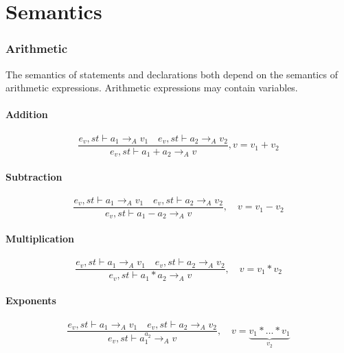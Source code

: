 \chapter{Semantics}\label{app:semantics}
\subsection*{Arithmetic}
The semantics of statements and declarations both depend on the semantics of arithmetic expressions.
Arithmetic expressions may contain variables.
\subsubsection{Addition}
\begin{equation}
	\frac { { e }_{ v },st\vdash { a }_{ 1 }{ \rightarrow  }_{ A }{ v }_{ 1 }\quad { e }_{ v },st\vdash { a }_{ 2 }{ \rightarrow  }_{ A }{ v }_{ 2 } }{ { e }_{ v },st\vdash { a }_{ 1 }+{ a }_{ 2 }{ \rightarrow  }_{ A }{ v } } , v = { v }_{ 1 }+{ v }_{ 2 }
\end{equation}

\subsubsection{Subtraction}
\begin{equation}
	\frac { { e }_{ v },st\vdash { a }_{ 1 }{ \rightarrow  }_{ A }{ v }_{ 1 }\quad { e }_{ v },st\vdash { a }_{ 2 }{ \rightarrow  }_{ A }{ v }_{ 2 } }{ { e }_{ v },st\vdash { a }_{ 1 }-{ a }_{ 2 }{ \rightarrow  }_{ A }{ v } } ,\quad v={ v }_{ 1 }-{ v }_{ 2 }
\end{equation}


\subsubsection{Multiplication}
\begin{equation}
	\frac { { e }_{ v },st\vdash { a }_{ 1 }{ \rightarrow  }_{ A }{ v }_{ 1 }\quad { e }_{ v },st\vdash { a }_{ 2 }{ \rightarrow  }_{ A }{ v }_{ 2 } }{ { e }_{ v },st\vdash { a }_{ 1 }\ast { a }_{ 2 }{ \rightarrow  }_{ A }{ v } } ,\quad v={ v }_{ 1 }\ast { v }_{ 2 }
\end{equation}

\subsubsection{Exponents}
\begin{equation}
	\frac { { e }_{ v },st\vdash { a }_{ 1 }{ \rightarrow  }_{ A }{ v }_{ 1 }\quad { e }_{ v },st\vdash { a }_{ 2 }{ \rightarrow  }_{ A }{ v }_{ 2 } }{ { e }_{ v },st\vdash { a }_{ 1 }^{ { a }_{ 2 } }{ \rightarrow  }_{ A }{ v } } ,\quad v=\underset { { v }_{ 2 } }{ \underbrace { v_{ 1 }*\dots *v_{ 1 } }  }
\end{equation}


